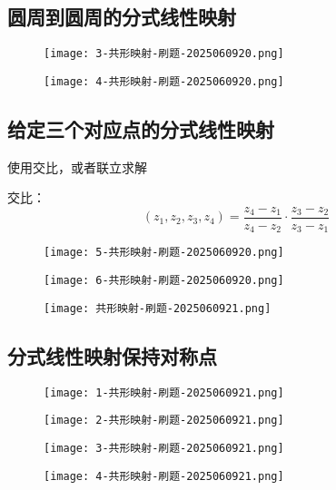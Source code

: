 \subsection{圆周到圆周的分式线性映射}

\begin{figure}[H]
\centering
\texttt{[image: 3-共形映射-刷题-2025060920.png]}
\label{}
\end{figure}
\begin{figure}[H]
\centering
\texttt{[image: 4-共形映射-刷题-2025060920.png]}
\label{}
\end{figure}

\subsection{给定三个对应点的分式线性映射}

使用交比，或者联立求解

交比：
\[
(z_1,z_2,z_3,z_4)=\frac{z_4-z_1}{z_4-z_2}\cdot\frac{z_3-z_2}{z_3-z_1}
\]
\begin{figure}[H]
\centering
\texttt{[image: 5-共形映射-刷题-2025060920.png]}
\label{}
\end{figure}
\begin{figure}[H]
\centering
\texttt{[image: 6-共形映射-刷题-2025060920.png]}
\label{}
\end{figure}
\begin{figure}[H]
\centering
\texttt{[image: 共形映射-刷题-2025060921.png]}
\label{}
\end{figure}

\subsection{分式线性映射保持对称点}

\begin{figure}[H]
\centering
\texttt{[image: 1-共形映射-刷题-2025060921.png]}
\label{}
\end{figure}
\begin{figure}[H]
\centering
\texttt{[image: 2-共形映射-刷题-2025060921.png]}
\label{}
\end{figure}

\begin{figure}[H]
\centering
\texttt{[image: 3-共形映射-刷题-2025060921.png]}
\label{}
\end{figure}
\begin{figure}[H]
\centering
\texttt{[image: 4-共形映射-刷题-2025060921.png]}
\label{}
\end{figure}

